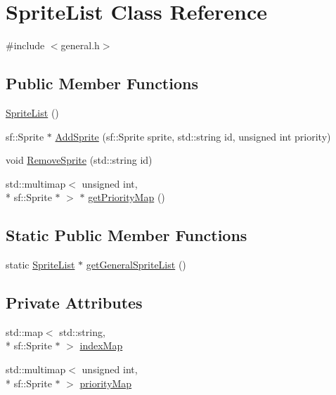 \hypertarget{class_sprite_list}{\section{Sprite\-List Class Reference}
\label{class_sprite_list}
}


{\ttfamily \#include $<$general.\-h$>$}

\subsection*{Public Member Functions}
\begin{DoxyCompactItemize}
\item 
\hyperlink{class_sprite_list_a73c339180c9a10829d376833ebf3f88a}{Sprite\-List} ()
\item 
sf\-::\-Sprite $\ast$ \hyperlink{class_sprite_list_a1f9cb9cef32d7b73e83539a8fc84c05d}{Add\-Sprite} (sf\-::\-Sprite sprite, std\-::string id, unsigned int priority)
\item 
void \hyperlink{class_sprite_list_acab29c36364d8b684e6d82d381a3a834}{Remove\-Sprite} (std\-::string id)
\item 
std\-::multimap$<$ unsigned int, \\*
sf\-::\-Sprite $\ast$ $>$ $\ast$ \hyperlink{class_sprite_list_a231c6090b04c2b0ba261f9ce5e3d1f1c}{get\-Priority\-Map} ()
\end{DoxyCompactItemize}
\subsection*{Static Public Member Functions}
\begin{DoxyCompactItemize}
\item 
static \hyperlink{class_sprite_list}{Sprite\-List} $\ast$ \hyperlink{class_sprite_list_a31aad8d098174638df4d85fae19d9176}{get\-General\-Sprite\-List} ()
\end{DoxyCompactItemize}
\subsection*{Private Attributes}
\begin{DoxyCompactItemize}
\item 
std\-::map$<$ std\-::string, \\*
sf\-::\-Sprite $\ast$ $>$ \hyperlink{class_sprite_list_aa0ca6f88f303676cb1592098cf4a38ea}{index\-Map}
\item 
std\-::multimap$<$ unsigned int, \\*
sf\-::\-Sprite $\ast$ $>$ \hyperlink{class_sprite_list_a79da3c65e989060ad28f5bb2690e757b}{priority\-Map}
\end{DoxyCompactItemize}


